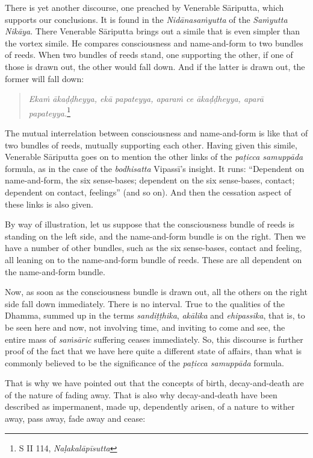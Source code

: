 There is yet another discourse, one preached by Venerable Sāriputta, which supports our conclusions. It is found in the \emph{Nidānasaṁyutta} of the \emph{Saṁyutta Nikāya}. There Venerable Sāriputta brings out a simile that is even simpler than the vortex simile. He compares consciousness and name-and-form to two bundles of reeds. When two bundles of reeds stand, one supporting the other, if one of those is drawn out, the other would fall down. And if the latter is drawn out, the former will fall down:

\begin{quote}
\emph{Ekaṁ ākaḍḍheyya, ekā papateyya, aparaṁ ce ākaḍḍheyya, aparā papateyya.}\footnote{S II 114, \emph{Naḷakalāpīsutta}}
\end{quote}

The mutual interrelation between consciousness and name-and-form is like that of two bundles of reeds, mutually supporting each other. Having given this simile, Venerable Sāriputta goes on to mention the other links of the \emph{paṭicca samuppāda} formula, as in the case of the \emph{bodhisatta} Vipassī's insight. It runs: ``Dependent on name-and-form, the six sense-bases; dependent on the six sense-bases, contact; dependent on contact, feelings'' (and so on). And then the cessation aspect of these links is also given.

By way of illustration, let us suppose that the consciousness bundle of reeds is standing on the left side, and the name-and-form bundle is on the right. Then we have a number of other bundles, such as the six sense-bases, contact and feeling, all leaning on to the name-and-form bundle of reeds. These are all dependent on the name-and-form bundle.

Now, as soon as the consciousness bundle is drawn out, all the others on the right side fall down immediately. There is no interval. True to the qualities of the Dhamma, summed up in the terms \emph{sandiṭṭhika}, \emph{akālika} and \emph{ehipassika}, that is, to be seen here and now, not involving time, and inviting to come and see, the entire mass of \emph{saṁsāric} suffering ceases immediately. So, this discourse is further proof of the fact that we have here quite a different state of affairs, than what is commonly believed to be the significance of the \emph{paṭicca samuppāda} formula.

That is why we have pointed out that the concepts of birth, decay-and-death are of the nature of fading away. That is also why decay-and-death have been described as impermanent, made up, dependently arisen, of a nature to wither away, pass away, fade away and cease:

